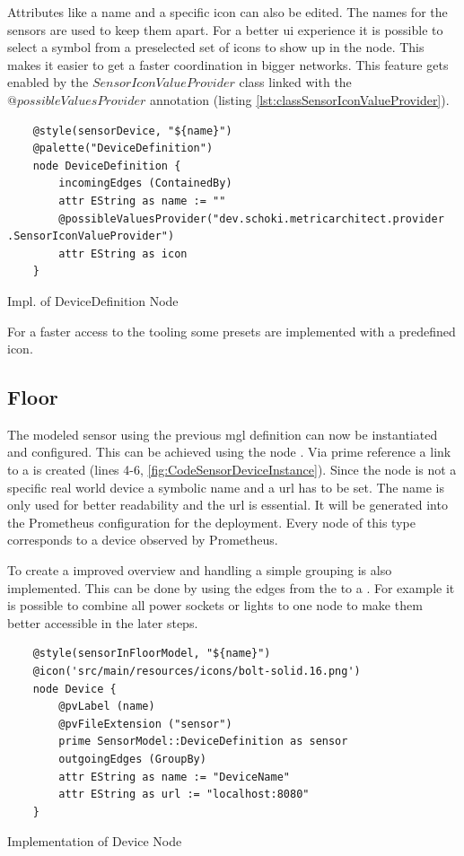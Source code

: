 Attributes like a name and a specific icon  can also be edited. The names for the sensors are used to keep them apart. For a better \gls{ui} experience it is possible to select a symbol from a preselected set of icons to show up in the node. This makes it easier to get a faster coordination in bigger networks. This feature gets enabled by the $SensorIconValueProvider$ class linked with the $@possibleValuesProvider$ annotation (listing \ref{lst:classSensorIconValueProvider}).
\begin{listing}[H]
	\begin{verbatim}
	@style(sensorDevice, "${name}")
	@palette("DeviceDefinition")
	node DeviceDefinition {
		incomingEdges (ContainedBy)
		attr EString as name := ""
		@possibleValuesProvider("dev.schoki.metricarchitect.provider .SensorIconValueProvider")
		attr EString as icon
	}	
	\end{verbatim}
	\caption{Impl. of DeviceDefinition Node}
	\label{fig:CodeSensorDevice}
\end{listing}
For a faster access to the tooling some presets are implemented with a predefined icon.
\subsection{Floor}
The modeled sensor using the previous \gls{mgl} definition can now be instantiated and configured. This can be achieved using the node . Via prime reference a link to a  is created (lines 4-6, \ref{fig:CodeSensorDeviceInstance}). Since the  node is not a specific real world device a symbolic name and a \gls{url} has to be set. The name is only used for better readability and the \gls{url} is essential. It will be generated into the Prometheus configuration for the deployment. Every node of this type corresponds to a device observed by Prometheus. 

To create a improved overview and handling a simple grouping is also implemented. This can be done by using the  edges from the  to a . For example it is possible to combine all power sockets or lights to one node to make them better accessible in the later steps. 

\begin{listing}[H]
	\begin{verbatim}
	@style(sensorInFloorModel, "${name}")
	@icon('src/main/resources/icons/bolt-solid.16.png')
	node Device {
		@pvLabel (name)
		@pvFileExtension ("sensor")
		prime SensorModel::DeviceDefinition as sensor
		outgoingEdges (GroupBy)
		attr EString as name := "DeviceName"
		attr EString as url := "localhost:8080"
	}	
	\end{verbatim}
	\caption{Implementation of Device Node}
	\label{fig:CodeSensorDeviceInstance}
\end{listing}


